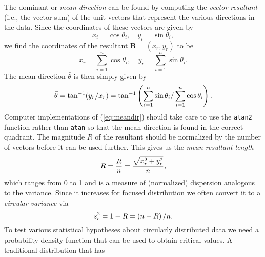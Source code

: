 The dominant or \emph{mean direction} can be found by computing the \emph{vector resultant} 
(i.e., the vector sum) of the unit vectors that represent the various directions in the data.  Since the 
coordinates of these vectors are given by
\begin{equation} 
x_{i}=\cos \theta_{i},\quad y_{i}=\sin \theta_{i},
\label{eq:xy_components}
\end{equation}	 	
we find the coordinates of the resultant $\mathbf{R} = (x_r, y_r)$ to be
\begin{equation} 
x_{r}=\displaystyle \sum^{n}_{i=1} \cos \theta_{i}, \quad y_{r}=\displaystyle \sum^{n}_{i=1} \sin \theta_{i}.
\end{equation}	 	
The mean direction $\bar{\theta}$ is then simply given by
\begin{equation}
	\index{Mean direction}
	\index{Direction!mean}
\bar{\theta}= \tan^{-1}(y_{r}/x_{r})=\tan^{-1} \left(\sum^{n}_{i=1} \sin \theta_{i}/\sum^{n}_{i=1}\cos \theta_{i} \right).
\label{eq:meandir}
\end{equation}
Computer implementations of (\ref{eq:meandir}) should take care to use the \texttt{atan2} function rather than \texttt{atan}
so that the mean direction is found in the correct quadrant.
The magnitude $R$ of the resultant should be normalized by the number of vectors before it can be 
used further.  This gives us the \emph{mean resultant length}
\begin{equation}
	\index{Mean resultant length}
	\index{Vector!mean resultant length}
\bar{R} = \frac{R}{n} = \frac{\sqrt{x^2_r + y^2_r}}{n},
\end{equation}
which ranges from 0 to 1 and is a measure of (normalized) dispersion analogous 
to the variance.  Since it increases for focused distribution we often convert it to a
\emph{circular variance} via
\begin{equation}
	\index{Variance!circular}
s^{2}_{c}=1- \bar{R}= \left( n-R \right) / n.
\end{equation}
To test various statistical hypotheses about circularly distributed data we need a 
probability density function that can be used to obtain critical values.  A traditional distribution that has 
